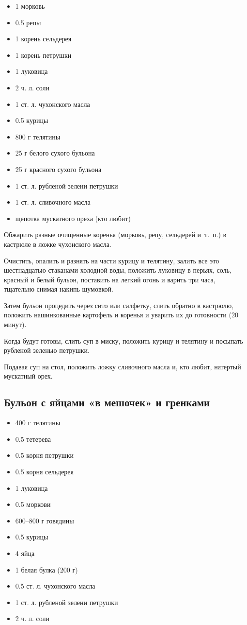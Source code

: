 \begin{itemize}
	\item 1 морковь 
    \item  0.5 репы 
    \item  1 корень сельдерея 
    \item  1 корень петрушки 
    \item  1 луковица 
    \item  2 ч. л. соли 
    \item  1 ст. л. чухонского масла 
    \item  0.5 курицы 
    \item  800 г телятины 
    \item  25 г белого сухого бульона 
    \item  25 г красного сухого бульона 
    \item  1 ст. л. рубленой зелени петрушки 
    \item  1 ст. л. сливочного масла 
    \item  щепотка мускатного ореха (кто любит)
\end{itemize}

Обжарить разные очищенные коренья (морковь, репу, сельдерей и~т.~п.) в кастрюле в ложке чухонского масла.

Очистить, опалить и разнять на части курицу и телятину, залить все это шестнадцатью стаканами холодной воды, положить луковицу в перьях, соль, красный и белый бульон, поставить на легкий огонь и варить три часа, тщательно снимая накипь шумовкой.

Затем бульон процедить через сито или салфетку, слить обратно в кастрюлю, положить нашинкованные картофель и коренья и уварить их до готовности (20 минут).

Когда будут готовы, слить суп в миску, положить курицу и телятину и посыпать рубленой зеленью петрушки.

Подавая суп на стол, положить ложку сливочного масла и, кто любит, натертый мускатный орех.

\subsection{Бульон с яйцами «в мешочек» и гренками}\label{7bul-jajca}

\begin{itemize}
	\item 400 г телятины 
    \item  0.5 тетерева 
    \item  0.5 корня петрушки 
    \item  0.5 корня сельдерея 
    \item  1 луковица 
    \item  0.5 моркови 
    \item  600–800 г говядины 
    \item  0.5 курицы 
    \item  4 яйца 
    \item  1 белая булка (200 г) 
    \item  0.5 ст. л. чухонского масла 
    \item  1 ст. л. рубленой зелени петрушки 
    \item  2 ч. л. соли
\end{itemize}

